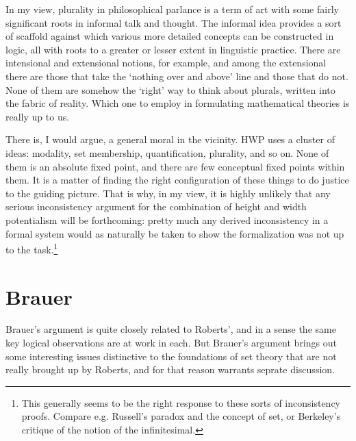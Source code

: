 \documentclass{article}
\begin{document}
In my view, plurality in philosophical parlance is a term of art with 
some fairly significant roots in informal talk and thought. 
The informal idea provides a sort of scaffold against which various more 
detailed concepts can be constructed in logic, all with roots to a greater 
or lesser extent in linguistic practice. There are intensional and extensional notions, 
for example, and among the extensional there are those that take the `nothing over and above'
line and those that do not. None of them are somehow the `right' way to think about plurals,
written into the fabric of reality. Which one to employ in formulating mathematical theories
is really up to us. 

There is, I would argue, a general moral in the vicinity.
HWP uses a cluster of ideas: modality, set membership, quantification, plurality, 
and so on. None of them is an absolute fixed point, and there are few 
conceptual fixed points within them. It is a matter of finding the right configuration 
of these things to do justice to the guiding picture. That is why, in my view,
it is highly unlikely that any serious inconsistency argument for the combination of
height and width potentialism will be forthcoming: 
pretty much any derived inconsistency  in a formal system would as naturally 
be taken to show 
the formalization was not up to the task.\footnote{This 
generally seems to be the right response to these sorts of inconsistency proofs.
Compare e.g. Russell's paradox and the concept of set, or Berkeley's 
critique of the notion of the infinitesimal.}

\section{Brauer}
Brauer's argument is quite closely related to Roberts', and in a sense the 
same key logical observations are at work in each. But Brauer's argument brings 
out some interesting issues distinctive to the foundations of set theory 
that are not really brought up by Roberts, and for that reason 
warrants seprate discussion.
\end{document}
